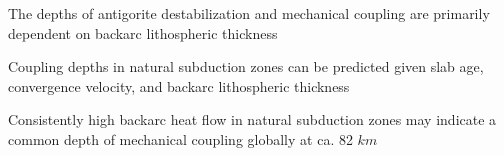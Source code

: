 \documentclass[draft,linenumbers]{agujournal2018}
\begin{document}




\begin{keypoints}
\item The depths of antigorite destabilization and mechanical coupling
are primarily dependent on backarc lithospheric thickness
\item Coupling depths in natural subduction zones can be predicted given
slab age, convergence velocity, and backarc lithospheric thickness
\item Consistently high backarc heat flow in natural subduction zones
may indicate a common depth of mechanical coupling globally at ca. 82
\(km\)
\end{keypoints}

%
%

\end{document}
